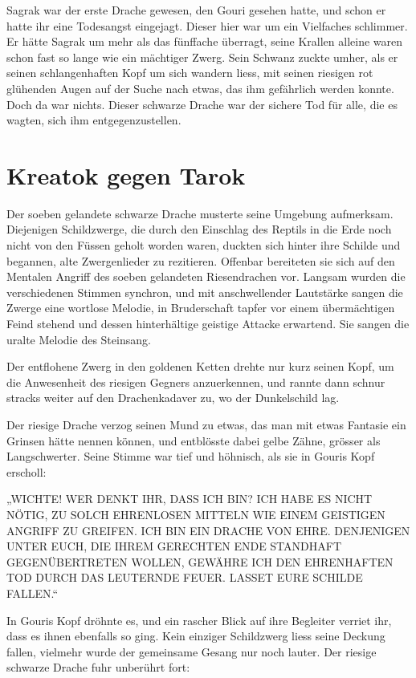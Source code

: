 Sagrak war der erste Drache gewesen, den Gouri gesehen hatte, und schon er hatte ihr eine Todesangst eingejagt. Dieser hier war um ein Vielfaches schlimmer. Er hätte Sagrak um mehr als das fünffache überragt, seine Krallen alleine waren schon fast so lange wie ein mächtiger Zwerg. Sein Schwanz zuckte umher, als er seinen schlangenhaften Kopf um sich wandern liess, mit seinen riesigen rot glühenden Augen auf der Suche nach etwas, das ihm gefährlich werden konnte. Doch da war nichts. Dieser schwarze Drache war der sichere Tod für alle, die es wagten, sich ihm entgegenzustellen.


\newpage
\section{Kreatok gegen Tarok}

Der soeben gelandete schwarze Drache musterte seine Umgebung aufmerksam. Diejenigen Schildzwerge, die durch den Einschlag des Reptils in die Erde noch nicht von den Füssen geholt worden waren, duckten sich hinter ihre Schilde und begannen, alte Zwergenlieder zu rezitieren. Offenbar bereiteten sie sich auf den Mentalen Angriff des soeben gelandeten Riesendrachen vor. Langsam wurden die verschiedenen Stimmen synchron, und mit anschwellender Lautstärke sangen die Zwerge eine wortlose Melodie, in Bruderschaft tapfer vor einem übermächtigen Feind stehend und dessen hinterhältige geistige Attacke erwartend. Sie sangen die uralte Melodie des Steinsang.

Der entflohene Zwerg in den goldenen Ketten drehte nur kurz seinen Kopf, um die Anwesenheit des riesigen Gegners anzuerkennen, und rannte dann schnur stracks weiter auf den Drachenkadaver zu, wo der Dunkelschild lag.

Der riesige Drache verzog seinen Mund zu etwas, das man mit etwas Fantasie ein Grinsen hätte nennen können, und entblösste dabei gelbe Zähne, grösser als Langschwerter. Seine Stimme war tief und höhnisch, als sie in Gouris Kopf erscholl:

„WICHTE! WER DENKT IHR, DASS ICH BIN? ICH HABE ES NICHT NÖTIG, ZU SOLCH EHRENLOSEN MITTELN WIE EINEM GEISTIGEN ANGRIFF ZU GREIFEN. ICH BIN EIN DRACHE VON EHRE. DENJENIGEN UNTER EUCH, DIE IHREM GERECHTEN ENDE STANDHAFT GEGENÜBERTRETEN WOLLEN, GEWÄHRE ICH DEN EHRENHAFTEN TOD DURCH DAS LEUTERNDE FEUER. LASSET EURE SCHILDE FALLEN.“

In Gouris Kopf dröhnte es, und ein rascher Blick auf ihre Begleiter verriet ihr, dass es ihnen ebenfalls so ging. Kein einziger Schildzwerg liess seine Deckung fallen, vielmehr wurde der gemeinsame Gesang nur noch lauter. Der riesige schwarze Drache fuhr unberührt fort:

